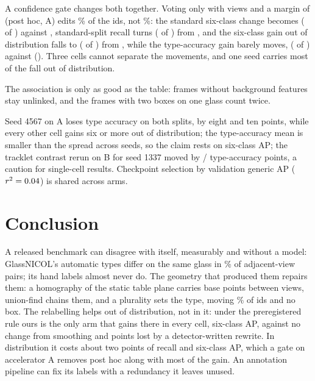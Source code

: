 \documentclass{article}
\begin{document}
A confidence gate changes both together. Voting only with \GateMinVotes{} views and a margin of \GateMargin{} (post hoc, A) edits \GateChangedPct\% of the ids, not \SceneChangedPct\%: the standard six-class change becomes \GateStdVsRaw{} (\GateStdVsRawPos{} of \GateCells{}) against \SvStdGainA{}, standard-split recall turns \GateStdRec{} (\GateStdRecPos{} of \GateCells{}) from \SvStdRec, and the six-class gain out of distribution falls to \GateOODVsRaw{} (\GateOODVsRawPos{} of \GateCells{}) from \SvOODGainA, while the type-accuracy gain barely moves, \GateOODTypeA{} (\GateOODTypeAPos{} of \GateCells{}) against \SvOODTypeA{} (\SvOODTypeAPos{}). Three cells cannot separate the movements, and one seed carries most of the fall out of distribution.

The association is only as good as the table: frames without background features stay unlinked, and the \DupFrames{} frames with two boxes on one glass count twice.

Seed 4567 on A loses type accuracy on both splits, by eight and ten points, while every other cell gains six or more out of distribution; the type-accuracy mean is smaller than the spread across seeds, so the claim rests on six-class AP; the tracklet contrast rerun on B for seed 1337 moved by \XHostTypeStd/\XHostTypeOOD{} type-accuracy points, a caution for single-cell results. Checkpoint selection by validation generic AP ($r^2=0.04$) is shared across arms.

\section{Conclusion}
A released benchmark can disagree with itself, measurably and without a model: GlassNICOL's automatic types differ on the same glass in \FlipRateReg\% of adjacent-view pairs; its hand labels almost never do. The geometry that produced them repairs them: a homography of the static table plane carries base points between views, union-find chains them, and a plurality sets the type, moving \SceneChangedPct\% of ids and no box. The relabelling helps out of distribution, not in it: under the preregistered rule ours is the only arm that gains there in every cell, \SvSixOODVsRawGain{} six-class AP, against no change from smoothing and \BaseCfOODDrop{} points lost by a detector-written rewrite. In distribution it costs about two points of recall and six-class AP, which a gate on accelerator A removes post hoc along with most of the gain. An annotation pipeline can fix its labels with a redundancy it leaves unused.



\end{document}
